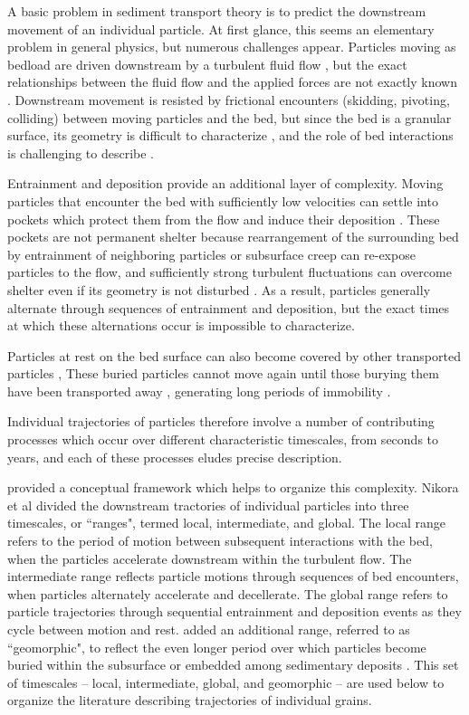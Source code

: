 A basic problem in sediment transport theory is to predict the downstream movement of an individual particle.
At first glance, this seems an elementary problem in general physics, but numerous challenges appear.
Particles moving as bedload are driven downstream by a turbulent fluid flow \citep{}, but the exact relationships between the fluid flow and the applied forces are not exactly known \citep{Coleman1967,Schmeeckle2007}.
Downstream movement is resisted by frictional encounters (skidding, pivoting, colliding) between moving particles and the bed, but since the bed is a granular surface, its geometry is difficult to characterize \citep{Gordon1972}, and the role of bed interactions is challenging to describe \citep{Sekine1992, Martin2013}.

Entrainment and deposition provide an additional layer of complexity.
Moving particles that encounter the bed with sufficiently low velocities can settle into pockets which protect them from the flow \citep{Miller1966} and induce their deposition \citep{Charru2004}.
These pockets are not permanent shelter because rearrangement of the surrounding bed by entrainment of neighboring particles or subsurface creep \citep{Houssais2016,Frey2014} can re-expose particles to the flow, and sufficiently strong turbulent fluctuations \citep{Cameron2020} can overcome shelter even if its geometry is not disturbed \citep{Valyrakis2010,Celik2014}. 
As a result, particles generally alternate through sequences of entrainment and deposition, but the exact times at which these alternations occur is impossible to characterize.

Particles at rest on the bed surface can also become covered by other transported particles \citep{Yang1971}, 
These buried particles cannot move again until those burying them have been transported away \citep{Nakagawa1981}, generating long periods of immobility \citep{Hassan1994,Ferguson2002}.

Individual trajectories of particles therefore involve a number of contributing processes which occur over different characteristic timescales, from seconds to years, and each of these processes eludes precise description.

\citet{Nikora2001,Nikora2002} provided a conceptual framework which helps to organize this complexity.
Nikora et al divided the downstream tractories of individual particles into three timescales, or ``ranges", termed local, intermediate, and global.
The local range refers to the period of motion between subsequent interactions with the bed, when the particles accelerate downstream within the turbulent flow.
The intermediate range reflects particle motions through sequences of bed encounters, when particles alternately accelerate and decellerate. 
The global range refers to particle trajectories through sequential entrainment and deposition events as they cycle between motion and rest.
\citet{Hassan2017} added an additional range, referred to as ``geomorphic", to reflect the even longer period over which particles become buried within the subsurface or embedded among sedimentary deposits \citep{Bradley2017,Pretzlav2021}.
This set of timescales -- local, intermediate, global, and geomorphic -- are used below to organize the literature describing trajectories of individual grains.

